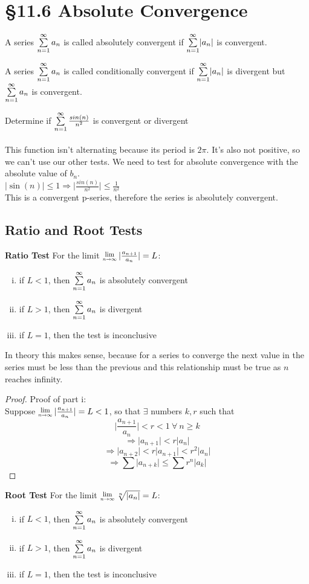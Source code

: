 \documentclass[12 pt]{article}
\begin{document}
	\section{\S 11.6 Absolute Convergence}
		\begin{def*}
			A series $\sum\limits_{n=1}^{\infty} a_n$ is called absolutely convergent if $\sum\limits_{n=1}^{\infty}\lvert a_n\rvert$ is convergent.
		\end{def*}
		\begin{def*}
			A series $\sum\limits_{n=1}^{\infty} a_n$ is called conditionally convergent if $\sum\limits_{n=1}^{\infty}\lvert a_n\rvert$ is divergent but $\sum\limits_{n=1}^{\infty} a_n$ is convergent.
		\end{def*}
		\begin{exmp*}
			Determine if $\sum\limits_{n=1}^{\infty} \frac{sin(n)}{n^2}$ is convergent or divergent\\\\
			This function isn't alternating because its period is $2\pi$. It's also not positive, so we can't use our other tests. We need to test for absolute convergence with the absolute value of $b_n$.\\
			$\lvert \sin(n)\rvert\leq 1\Rightarrow \lvert\frac{sin(n)}{n^2}\rvert\leq \frac{1}{n^2}$\\
			This is a convergent p-series, therefore the series is absolutely convergent.
		\end{exmp*}
	\subsection{Ratio and Root Tests}
		\textbf{Ratio Test}
		For the limit $\Lim{n\toinfty}\lvert\frac{a_{n+1}}{a_n}\rvert=L$:
		\begin{enumerate}[i)]
			\item if $L<1$, then $\sum\limits_{n=1}^{\infty} a_n$ is absolutely convergent
			\item if $L>1$, then $\sum\limits_{n=1}^{\infty} a_n$ is divergent
			\item if $L=1$, then the test is inconclusive
		\end{enumerate}
		In theory this makes sense, because for a series to converge the next value in the series must be less than the previous and this relationship must be true as $n$ reaches infinity.
		\begin{proof}
			Proof of part i:\\
			Suppose $\Lim{n\toinfty} \lvert \frac{a_{n+1}}{a_n} \rvert=L<1$, so that $\exists$ numbers $k,r$ such that
			$$\lvert\frac{a_{n+1}}{a_n}\rvert<r<1\ \forall\ n\geq k$$
			$$\Rightarrow \lvert a_{n+1}\rvert<r\lvert a_n\rvert$$
			$$\Rightarrow \lvert a_{n+2}\rvert<r\lvert a_{n+1}\rvert<r^2\lvert a_n\rvert$$
			$$\Rightarrow \sum\lvert a_{n+k}\rvert\leq\sum r^n\lvert{a_k}\rvert$$
		\end{proof}
		\textbf{Root Test}
		For the limit $\Lim{n\toinfty}\sqrt[n]{\lvert a_n\rvert}=L$:
		\begin{enumerate}[i)]
			\item if $L<1$, then $\sum\limits_{n=1}^{\infty} a_n$ is absolutely convergent
			\item if $L>1$, then $\sum\limits_{n=1}^{\infty} a_n$ is divergent
			\item if $L=1$, then the test is inconclusive
		\end{enumerate}
\end{document}
